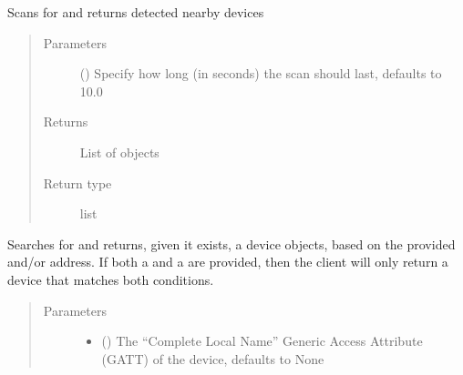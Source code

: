 \documentclass[letterpaper,10pt,english]{sphinxmanual}
\begin{document}
\begin{fulllineitems}
\begin{fulllineitems}
\label{\detokenize{PandaBot:PandaBot.PandaBotClient.scan}}
Scans for and returns detected nearby devices
\begin{quote}\begin{description}
\item[{Parameters}] \leavevmode
{} (\sphinxstyleliteralemphasis{\sphinxupquote{, }}) \textendash{} Specify how long (in seconds) the scan should last, defaults to 10.0

\item[{Returns}] \leavevmode
List of {\hyperref[\detokenize{PandaBot:PandaBot.PandaBotDevice}]{}} objects

\item[{Return type}] \leavevmode
list

\end{description}\end{quote}

\end{fulllineitems}


\begin{fulllineitems}
\label{\detokenize{PandaBot:PandaBot.PandaBotClient.searchDevice}}
Searches for and returns, given it exists, a {\hyperref[\detokenize{PandaBot:PandaBot.PandaBotDevice}]{}} device objects, based on the provided  and/or  address. If both a  and a  are provided, then the client will only return a device that matches both conditions.
\begin{quote}\begin{description}
\item[{Parameters}] \leavevmode\begin{itemize}
\item {} 
 (\sphinxstyleliteralemphasis{\sphinxupquote{, }}) \textendash{} The “Complete Local Name” Generic Access Attribute (GATT) of the device, defaults to None


\end{itemize}
\end{description}
\end{quote}
\end{fulllineitems}
\end{fulllineitems}
\end{document}

